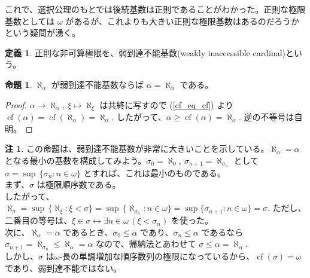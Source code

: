 \documentclass{jsarticle}
\theoremstyle{definition}
\newtheorem*{definition*}{定義}
\newtheorem{proposition}[theorem]{命題}
\newtheorem{remark}{注}[section]
\begin{document}
    \vspace{1.0ex}
    これで、選択公理のもとでは後続基数は正則であることがわかった。正則な極限基数としては $\omega$ があるが、これよりも大きい正則な極限基数はあるのだろうかという疑問が湧く。
    
    \begin{definition*}
        正則な非可算極限を、弱到達不能基数(weakly inaccessible cardinal)という。
    \end{definition*}
    \begin{proposition}
        $\aleph_\alpha$ が弱到達不能基数ならば $\alpha = \aleph_\alpha$ である。
    \end{proposition}
    \begin{proof}
        $\alpha \rightarrow \aleph_\alpha, \ \xi \mapsto \aleph_\xi$ は共終に写すので (\ref{cf_eq_cf}) より $\operatorname{cf}(\alpha) = \operatorname{cf}(\aleph_\alpha) = \aleph_\alpha.$ したがって、$\alpha \geq \operatorname{cf}(\alpha) = \aleph_\alpha.$ 逆の不等号は自明。
    \end{proof}
    \begin{remark}
        この命題は、弱到達不能基数が非常に大きいことを示している。$\aleph_\alpha = \alpha$ となる最小の基数を構成してみよう。$\sigma_0 = \aleph_0, \ \sigma_{n+1} = \aleph_{\sigma_n}$ として $\sigma = \sup \, \{\sigma_n : n \in \omega\}$ とすれば、これは最小のものである。\\
        まず、$\sigma$ は極限順序数である。\\
        したがって、$\aleph_\sigma = \sup \, \{\aleph_\xi : \xi < \sigma\} = \sup \, \{\aleph_{\sigma_n} : n \in \omega\} = \sup \{\sigma_{n+1} : n \in \omega\} = \sigma.$ ただし、二番目の等号は、$\xi \in \sigma \leftrightarrow \exists n \in \omega \, (\xi < \sigma_n)$ を使った。\\
        次に、$\aleph_\alpha = \alpha$ であるとき、$\sigma_0 \leq \alpha$ であり、$\sigma_n \leq \alpha$ であるなら $\sigma_{n+1} = \aleph_{\sigma_n} \leq \aleph_{\alpha} = \alpha$ なので、帰納法とあわせて $\sigma \leq \alpha = \aleph_\alpha.$\\
        しかし、$\sigma$ は$\omega$-長の単調増加な順序数列の極限になっているから、$\operatorname{cf}(\sigma) = \omega$ であり、弱到達不能ではない。
    \end{remark}
    
    \vspace{1.0ex}
    
\end{document}
